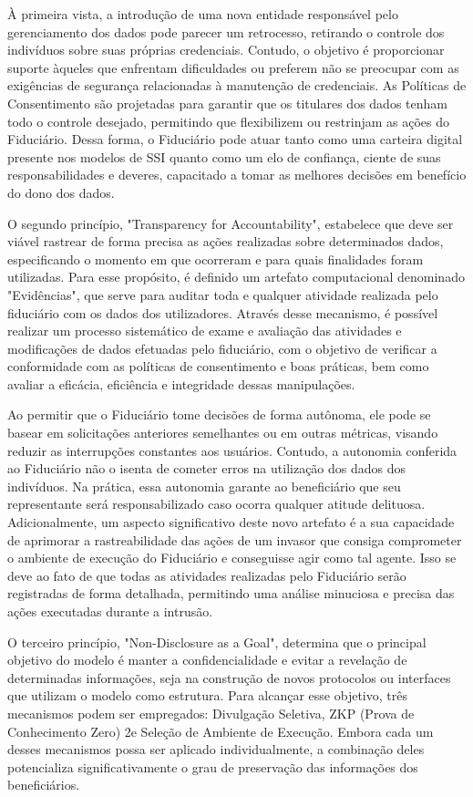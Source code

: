 À primeira vista, a introdução de uma nova entidade responsável pelo gerenciamento dos dados pode parecer um retrocesso, retirando o controle dos indivíduos sobre suas próprias credenciais. Contudo, o objetivo é proporcionar suporte àqueles que enfrentam dificuldades ou preferem não se preocupar com as exigências de segurança relacionadas à manutenção de credenciais. As Políticas de Consentimento são projetadas para garantir que os titulares dos dados tenham todo o controle desejado, permitindo que flexibilizem ou restrinjam as ações do Fiduciário. Dessa forma, o Fiduciário pode atuar tanto como uma carteira digital presente nos modelos de \acs{SSI} quanto como um elo de confiança, ciente de suas responsabilidades e deveres, capacitado a tomar as melhores decisões em benefício do dono dos dados.

O segundo princípio, "Transparency for Accountability", estabelece que deve ser viável rastrear de forma precisa as ações realizadas sobre determinados dados, especificando o momento em que ocorreram e para quais finalidades foram utilizadas. Para esse propósito, é definido um artefato computacional denominado "Evidências", que serve para auditar toda e qualquer atividade realizada pelo fiduciário com os dados dos utilizadores. Através desse mecanismo, é possível realizar um processo sistemático de exame e avaliação das atividades e modificações de dados efetuadas pelo fiduciário, com o objetivo de verificar a conformidade com as políticas de consentimento e boas práticas, bem como avaliar a eficácia, eficiência e integridade dessas manipulações.

Ao permitir que o Fiduciário tome decisões de forma autônoma, ele pode se basear em solicitações anteriores semelhantes ou em outras métricas, visando reduzir as interrupções constantes aos usuários. Contudo, a autonomia conferida ao Fiduciário não o isenta de cometer erros na utilização dos dados dos indivíduos. Na prática, essa autonomia garante ao beneficiário que seu representante será responsabilizado caso ocorra qualquer atitude delituosa. Adicionalmente, um aspecto significativo deste novo artefato é a sua capacidade de aprimorar a rastreabilidade das ações de um invasor que consiga comprometer o ambiente de execução do Fiduciário e conseguisse agir como tal agente. Isso se deve ao fato de que todas as atividades realizadas pelo Fiduciário serão registradas de forma detalhada, permitindo uma análise minuciosa e precisa das ações executadas durante a intrusão.

O terceiro princípio, "Non-Disclosure as a Goal", determina que o principal objetivo do modelo é manter a confidencialidade e evitar a revelação de determinadas informações, seja na construção de novos protocolos ou interfaces que utilizam o modelo como estrutura. Para alcançar esse objetivo, três mecanismos podem ser empregados: Divulgação Seletiva, \acs{ZKP} (Prova de Conhecimento Zero) 2e Seleção de Ambiente de Execução. Embora cada um desses mecanismos possa ser aplicado individualmente, a combinação deles potencializa significativamente o grau de preservação das informações dos beneficiários.


